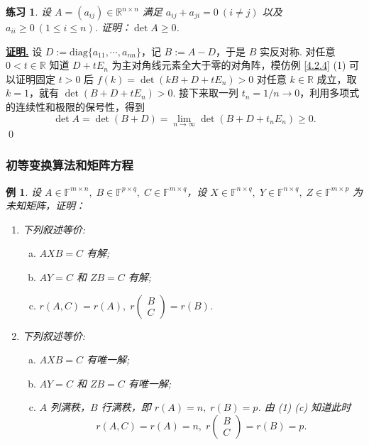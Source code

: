 \documentclass[10pt,openany]{article}
\theoremstyle{thmstyle} %
\newtheorem{practice}{练习}[section]
\theoremstyle{defstyle} %
\theoremstyle{prostyle} %
\theoremstyle{exastyle}
\newtheorem{example}[theorem]{例}
\theoremstyle{remstyle}
\renewenvironment{proof}[1][证明]{\par\underline{\textbf{#1.}} \;\fangsong}{\qed\par}
\newcommand{\F}{\mathbb{F}}
\newcommand{\R}{\mathbb{R}}
\newcommand{\n}{^{n \times n}}
\newcommand{\diag}{\mathrm{diag}}
\begin{document}
\begin{practice}
	设 \( A=(a_{ij}) \in \R\n \) 满足 \( a_{ij}+a_{ji}=0 \ (i \neq j) \) 以及 \( a_{ii} \geq 0 \ (1 \leq i \leq n) \). 证明：\( \det A \geq 0 \).
\end{practice}

\begin{proof}
   设 \( D:=\diag\{a_{11},\cdots,a_{nn} \} \)，记 \( B:=A-D \)，于是 \( B \) 实反对称. 对任意 \( 0<t \in \R \) 知道 \( D+tE_n \) 为主对角线元素全大于零的对角阵，模仿例 \ref{4.2.4} (1) 可以证明固定 \(t>0 \) 后 \( f(k)=\det(kB+D+tE_n)>0 \) 对任意 \( k \in \R \) 成立，取 \( k=1 \)，就有 \( \det(B+D+tE_n)>0 \). 接下来取一列 \( t_n=1/n \to 0 \)，利用多项式的连续性和极限的保号性，得到
   \[ \det A= \det(B+D)= \lim\limits_{n \to \infty} \det(B+D+t_nE_n) \geq 0. \]
\end{proof}

\subsubsection{初等变换算法和矩阵方程}

\begin{example} \label{4.2.5}
	设 \( A \in \F^{m \times n}, \; B \in \F^{p \times q}, \; C \in \F^{m \times q} \)，设 \( X \in \F^{n \times q}, \; Y \in \F^{n \times q}, \; Z \in \F^{m \times p} \) 为未知矩阵，证明：
	\begin{enumerate}[(1)]
		\item 下列叙述等价:
		\begin{enumerate}[(a)]
			\item \( AXB=C \) 有解;
			\item \( AY=C \) 和 \( ZB=C \) 有解;
			\item \( r(A,C)=r(A), \; r\begin{pmatrix}
				B \\ C
			\end{pmatrix}=r(B) \).
		\end{enumerate} 
		\item 下列叙述等价:
		\begin{enumerate}[(a)]
			\item \( AXB=C \) 有唯一解;
			\item \( AY=C \) 和 \( ZB=C \) 有唯一解;
			\item \( A \) 列满秩，\( B \) 行满秩，即 \( r(A)=n, \; r(B)=p \). 由 (1) (c) 知道此时
			\[ r(A,C)=r(A)=n, \; r\begin{pmatrix}
				B \\ C
			\end{pmatrix}=r(B)=p.\]
		\end{enumerate}
	\end{enumerate}
\end{example}
\end{document}
